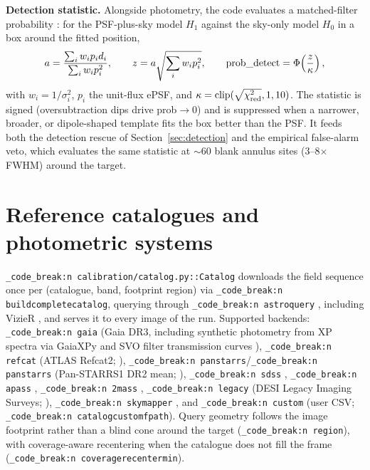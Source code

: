 \documentclass[11pt,a4paper]{article}
\renewcommand{\_}{\autophotunderscore\allowbreak}
\DeclareRobustCommand{\code}[1]{\texttt{\autophot_code_break:n {#1}}}
\begin{document}
\textbf{Detection statistic.} Alongside photometry, the code evaluates a
matched-filter probability \citep{zackay2016proper}: for the
PSF-plus-sky model $H_1$ against the sky-only model $H_0$ in a box around
the fitted position,
\begin{equation}
a=\frac{\sum_i w_i p_i d_i}{\sum_i w_i p_i^2},\qquad
z=a\sqrt{\sum_i w_i p_i^2},\qquad
\mathrm{prob\_detect}=\Phi\!\left(\frac{z}{\kappa}\right),
\end{equation}
with $w_i=1/\sigma_i^2$, $p_i$ the unit-flux ePSF, and
$\kappa=\mathrm{clip}(\sqrt{\chi^2_{\rm red}},1,10)$. The statistic is
signed (oversubtraction dips drive prob$\to0$) and is suppressed when a
narrower, broader, or dipole-shaped template fits the box better than the
PSF. It feeds both the detection rescue of
Section~\ref{sec:detection} and the empirical false-alarm veto, which
evaluates the same statistic at $\sim$60 blank annulus sites
(3--8$\times$FWHM) around the target.

\section{Reference catalogues and photometric systems}
\label{sec:catalog}

\code{calibration/catalog.py::Catalog} downloads the field sequence once
per (catalogue, band, footprint region) via \code{build\_complete\_catalog},
querying through \code{astroquery} \citep{ginsburg2019astroquery},
including VizieR \citep{ochsenbein2000vizier},
and serves it to every image of the run. Supported backends:
\code{gaia} (Gaia DR3, including synthetic photometry from XP spectra via
GaiaXPy \citep{weiler2023gaiaxpy} and SVO filter transmission curves
\citep{rodrigo2012svo,gaia2023dr3}), \code{refcat} (ATLAS Refcat2;
\citealp{tonry2018refcat}), \code{pan\_starrs}\slash\code{panstarrs}
(Pan-STARRS1 DR2 mean; \citealp{chambers2016panstarrs,tonry2012ps1}),
\code{sdss} \citep{york2000sdss}, \code{apass}
\citep{henden2016apass}, \code{2mass} \citep{skrutskie2006twomass},
\code{legacy} (DESI Legacy Imaging Surveys; \citealp{dey2019legacy}),
\code{skymapper} \citep{wolf2018skymapper}, and \code{custom} (user CSV;
\code{catalog\_custom\_fpath}). Query geometry follows the image
footprint rather than a blind cone around the target
(\code{region\_*}), with coverage-aware recentering when the catalogue
does not fill the frame (\code{coverage\_recenter\_min}).
\end{document}
